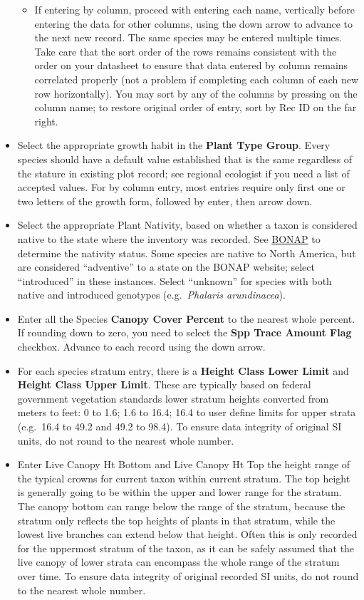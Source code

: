 \documentclass[
]{book}
\providecommand{\tightlist}{%
  \setlength{\itemsep}{0pt}\setlength{\parskip}{0pt}}
\begin{document}
\begin{itemize}
  \begin{itemize}
  \tightlist
  \item
    If entering by column, proceed with entering each name, vertically before entering the data for other columns, using the down arrow to advance to the next new record. The same species may be entered multiple times. Take care that the sort order of the rows remains consistent with the order on your datasheet to ensure that data entered by column remains correlated properly (not a problem if completing each column of each new row horizontally). You may sort by any of the columns by pressing on the column name; to restore original order of entry, sort by Rec ID on the far right.
  \end{itemize}
\item
  Select the appropriate growth habit in the \textbf{Plant Type Group}. Every species should have a default value established that is the same regardless of the stature in existing plot record; see regional ecologist if you need a list of accepted values. For by column entry, most entries require only first one or two letters of the growth form, followed by enter, then arrow down.
\item
  Select the appropriate Plant Nativity, based on whether a taxon is considered native to the state where the inventory was recorded. See \href{http://bonap.net/tdc}{BONAP} to determine the nativity status. Some species are native to North America, but are considered ``adventive'' to a state on the BONAP website; select ``introduced'' in these instances. Select ``unknown'' for species with both native and introduced genotypes (e.g.~\emph{Phalaris arundinacea}).
\item
  Enter all the Species \textbf{Canopy Cover Percent} to the nearest whole percent. If rounding down to zero, you need to select the \textbf{Spp Trace Amount Flag} checkbox. Advance to each record using the down arrow.
\item
  For each species stratum entry, there is a \textbf{Height Class Lower Limit} and \textbf{Height Class Upper Limit}. These are typically based on federal government vegetation standards \citep{usnvc2008} lower stratum heights converted from meters to feet: 0 to 1.6; 1.6 to 16.4; 16.4 to user define limits for upper strata (e.g.~16.4 to 49.2 and 49.2 to 98.4). To ensure data integrity of original SI units, do not round to the nearest whole number.
\item
  Enter Live Canopy Ht Bottom and Live Canopy Ht Top the height range of the typical crowns for current taxon within current stratum. The top height is generally going to be within the upper and lower range for the stratum. The canopy bottom can range below the range of the stratum, because the stratum only reflects the top heights of plants in that stratum, while the lowest live branches can extend below that height. Often this is only recorded for the uppermost stratum of the taxon, as it can be safely assumed that the live canopy of lower strata can encompass the whole range of the stratum over time. To ensure data integrity of original recorded SI units, do not round to the nearest whole number.

\end{itemize}
\end{document}

